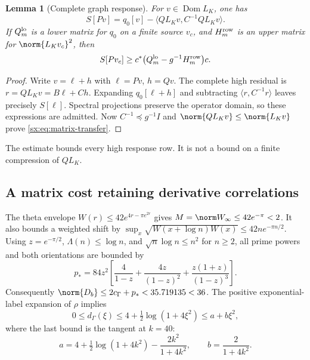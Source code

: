 \documentclass[11pt,a4paper]{article}
\numberwithin{equation}{section}
\newtheorem{lemma}[theorem]{Lemma}
\theoremstyle{definition}\newtheorem{definition}[theorem]{Definition}
\theoremstyle{remark}\newtheorem{remark}[theorem]{Remark}
\begin{document}
\begin{lemma}[Complete graph response]\label{sx:lem:graph}
For $v\in\operatorname{Dom}L_K$, one has
\begin{equation}\label{sx:eq:identity}
 S[Pv]=q_0[v]-\langle QL_Kv,C^{-1}QL_Kv\rangle.
\end{equation}
If $Q_m^{\rm lo}$ is a lower matrix for $q_0$ on a finite source
$v_c$, and $H_m^{\rm row}$ is an upper matrix for
$\norm{L_Kv_c}^2$, then
\begin{equation}\label{sx:eq:matrix-transfer}
 S[Pv_c]\ge c^*\bigl(Q_m^{\rm lo}-g^{-1}H_m^{\rm row}\bigr)c.
\end{equation}
\end{lemma}
\begin{proof}
Write $v=\ell+h$ with $\ell=Pv$, $h=Qv$. The complete high residual is
$r=QL_Kv=B\ell+Ch$. Expanding $q_0[\ell+h]$ and subtracting
$\langle r,C^{-1}r\rangle$ leaves precisely $S[\ell]$.
Spectral projections preserve the operator domain, so these expressions
are admitted. Now $C^{-1}\preceq g^{-1}I$ and
$\norm{QL_Kv}\le\norm{L_Kv}$ prove \eqref{sx:eq:matrix-transfer}.
\end{proof}
The estimate bounds every high response row. It is not a bound on a
finite compression of $QL_K$.

\subsection{A matrix cost retaining derivative correlations}
The theta envelope $W(r)\le42e^{4r-\pi e^{2r}}$ gives
$M=\norm W_\infty\le42e^{-\pi}<2$.
It also bounds a weighted shift by
$\sup_x\sqrt{W(x+\log n)W(x)}\le42ne^{-\pi n/2}$.
Using $z=e^{-\pi/2}$, $\Lambda(n)\le\log n$, and
$\sqrt n\log n\le n^2$ for $n\ge2$, all prime powers and both
orientations are bounded by
\[
 p_* =84z^2\left[\frac4{1-z}+\frac{4z}{(1-z)^2}
                      +\frac{z(1+z)}{(1-z)^3}\right].
\]
Consequently $\norm{D_b}\le2c_\Gamma+p_*<35.719135<36$.
The positive exponential-label expansion of $\rho$ implies
\[
 0\le d_\Gamma(\xi)\le4+\tfrac12\log(1+4\xi^2)\le a+b\xi^2,
\]
where the last bound is the tangent at $k=40$:
\[
 a=4+\tfrac12\log(1+4k^2)-\frac{2k^2}{1+4k^2},\qquad
 b=\frac2{1+4k^2}.
\]
\end{document}
